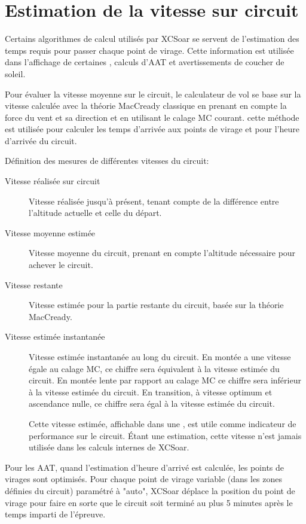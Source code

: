 \section{Estimation de la vitesse sur circuit}\label{sec:task-speed-estim}

Certains algorithmes de calcul utilisés par XCSoar se servent de l'estimation des temps requis pour passer chaque point de virage. Cette information est utilisée dans l'affichage de certaines {\InfoBox}, calculs d'AAT et avertissements de coucher de soleil.

Pour évaluer la vitesse moyenne sur le circuit, le calculateur de vol se base sur la vitesse calculée avec la théorie MacCready classique en prenant en compte la force du vent et sa direction et en utilisant le calage MC courant. cette méthode est utilisée pour calculer les temps d'arrivée aux points de virage et pour l'heure d'arrivée du circuit.

Définition des mesures de différentes vitesses du circuit:
\begin{description}
\item[Vitesse réalisée sur circuit]  Vitesse réalisée jusqu'à présent, tenant compte de la différence entre l'altitude actuelle et celle du départ.
\item[Vitesse moyenne estimée]  Vitesse moyenne du circuit, prenant en compte l'altitude nécessaire pour achever le circuit.
\item[Vitesse restante]  Vitesse estimée pour la partie restante du circuit, basée sur la théorie MacCready.
\item[Vitesse estimée instantanée]  Vitesse estimée instantanée au long du circuit. En montée a une vitesse égale au calage MC, ce chiffre sera équivalent à la vitesse estimée du circuit. En montée lente par rapport au calage MC ce chiffre sera inférieur à la vitesse estimée du circuit. En transition, à vitesse optimum et ascendance nulle, ce chiffre sera égal  à la vitesse estimée du circuit.

Cette vitesse estimée, affichable dans une {\InfoBox}, est utile comme indicateur de performance sur le circuit. Étant une estimation, cette vitesse n'est jamais utilisée dans les calculs internes de XCSoar.
\end{description}

Pour les AAT, quand l'estimation d'heure d'arrivé est calculée, les points de virages sont optimisés. \tip Pour chaque point de virage variable (dans les zones définies du circuit) paramétré à "auto", XCSoar déplace la position du point de virage pour faire en sorte que le circuit soit terminé au plus 5 minutes après le temps imparti de l'épreuve.

